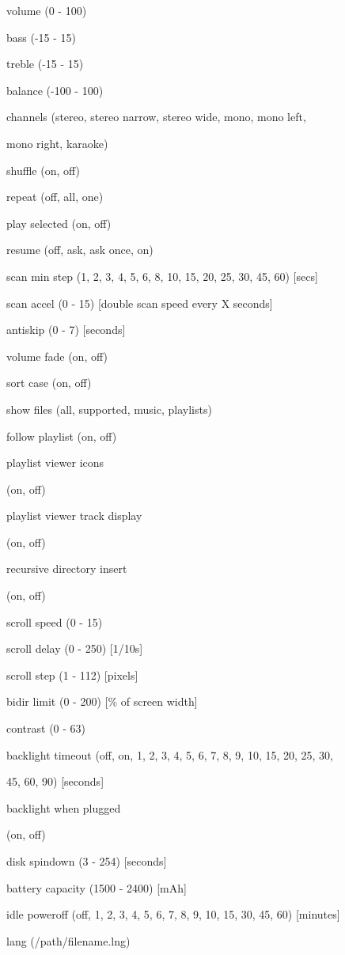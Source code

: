 volume   (0 {}- 100)

bass    ({}-15 {}- 15)

treble    ({}-15 {}- 15)

balance   ({}-100 {}- 100)

channels   (stereo, stereo narrow, stereo wide, mono, mono left,

     mono right, karaoke)

shuffle   (on, off)

repeat   (off, all, one)

play selected  (on, off)

resume   (off, ask, ask once, on)

scan min step  (1, 2, 3, 4, 5, 6, 8, 10, 15, 20, 25, 30, 45, 60) [secs]

scan accel   (0 {}- 15) [double scan speed every X seconds]

antiskip   (0 {}- 7) [seconds]

volume fade  (on, off)

sort case   (on, off)

show files   (all, supported, music, playlists)

follow playlist  (on, off)

playlist viewer icons

    (on, off)

playlist viewer track display

    (on, off)

recursive directory insert

    (on, off)

scroll speed  (0 {}- 15) 

scroll delay   (0 {}- 250) [1/10s]

scroll step   (1 {}- 112) [pixels]

bidir limit   (0 {}- 200) [\% of screen width]

contrast   (0 {}- 63)

backlight timeout  (off, on, 1, 2, 3, 4, 5, 6, 7, 8, 9, 10, 15, 20, 25,
30, 

     45, 60, 90) [seconds]

backlight when plugged 

    (on, off)

disk spindown  (3 {}- 254) [seconds]

battery capacity  (1500 {}- 2400) [mAh]

idle poweroff  (off, 1, 2, 3, 4, 5, 6, 7, 8, 9, 10, 15, 30, 45, 60)     
 [minutes]

lang    (/path/filename.lng)

